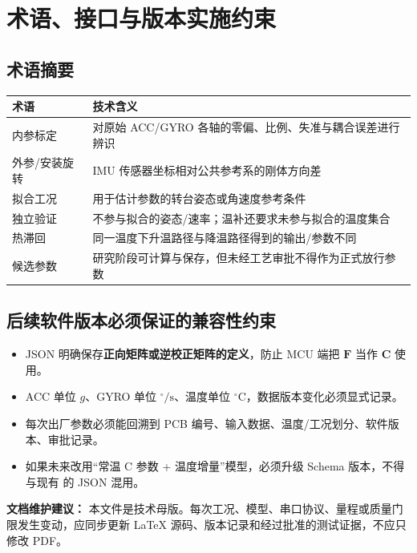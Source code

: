 \chapter{术语、接口与版本实施约束}
\section*{术语摘要}
\noindent\begin{tabularx}{\linewidth}{@{}p{33mm}Y@{}}\toprule
术语 & 技术含义\\\midrule
内参标定 & 对原始 ACC/GYRO 各轴的零偏、比例、失准与耦合误差进行辨识\\
外参/安装旋转 & IMU 传感器坐标相对公共参考系的刚体方向差\\
拟合工况 & 用于估计参数的转台姿态或角速度参考条件\\
独立验证 & 不参与拟合的姿态/速率；温补还要求未参与拟合的温度集合\\
热滞回 & 同一温度下升温路径与降温路径得到的输出/参数不同\\
候选参数 & 研究阶段可计算与保存，但未经工艺审批不得作为正式放行参数\\
\bottomrule\end{tabularx}
\section*{后续软件版本必须保证的兼容性约束}
\begin{itemize}
\item JSON 明确保存\textbf{正向矩阵或逆校正矩阵的定义}，防止 MCU 端把 $\mathbf F$ 当作 $\mathbf C$ 使用。
\item ACC 单位 $g$、GYRO 单位 $^\circ/\mathrm{s}$、温度单位 $^\circ\mathrm C$，数据版本变化必须显式记录。
\item 每次出厂参数必须能回溯到 PCB 编号、输入数据、温度/工况划分、软件版本、审批记录。
\item 如果未来改用“常温 C 参数 + 温度增量”模型，必须升级 Schema 版本，不得与现有 的 JSON 混用。
\end{itemize}
\begin{notice}
\textbf{文档维护建议：} 本文件是技术母版。每次工况、模型、串口协议、量程或质量门限发生变动，应同步更新 LaTeX 源码、版本记录和经过批准的测试证据，不应只修改 PDF。
\end{notice}

